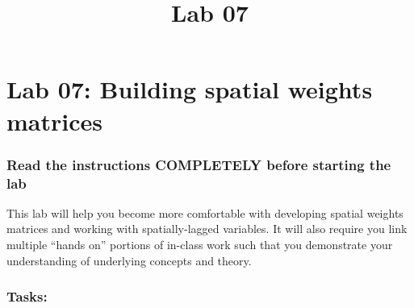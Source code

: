 \documentclass[]{article}
\title{Lab 07}
\author{}
\date{}
\makeatletter
\renewcommand{\maketitle}{\bgroup\vspace*{-1cm}\setlength{\parindent}{0pt}
\begin{flushleft}
  \@author
  
  \@date
  
\end{flushleft}\egroup
}
\makeatother
\begin{document}
\maketitle

\hypertarget{lab-07-building-spatial-weights-matrices}{%
\section{Lab 07: Building spatial weights
matrices}\label{lab-07-building-spatial-weights-matrices}}

\hypertarget{read-the-instructions-completely-before-starting-the-lab}{%
\subsubsection{Read the instructions COMPLETELY before starting the
lab}\label{read-the-instructions-completely-before-starting-the-lab}}

This lab will help you become more comfortable with developing spatial
weights matrices and working with spatially-lagged variables. It will
also require you link multiple ``hands on'' portions of in-class work
such that you demonstrate your understanding of underlying concepts and
theory.

\hypertarget{tasks}{%
\subsubsection{Tasks:}\label{tasks}}
\end{document}
